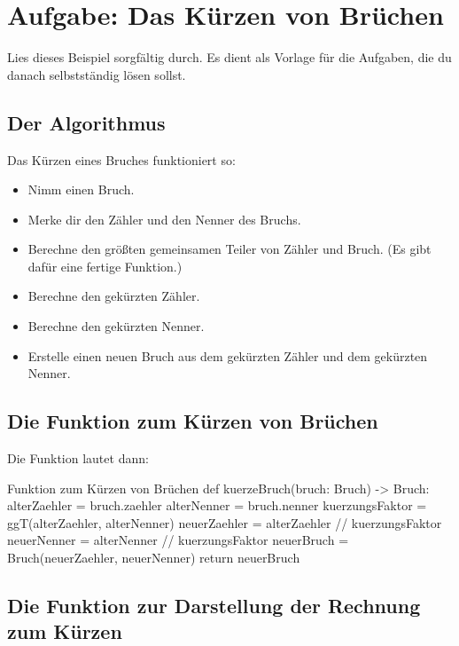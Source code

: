 \section{Aufgabe: Das Kürzen von Brüchen}

Lies dieses Beispiel sorgfältig durch. Es dient als Vorlage für die Aufgaben, die du danach selbstständig lösen sollst.

\subsection{Der Algorithmus}

Das Kürzen eines Bruches funktioniert so:
\begin{itemize}
	\item Nimm einen Bruch.
	\item Merke dir den Zähler und den Nenner des Bruchs.
	\item Berechne den größten gemeinsamen Teiler von Zähler und Bruch. (Es gibt dafür eine fertige Funktion.)
	\item Berechne den gekürzten Zähler.
	\item Berechne den gekürzten Nenner.
	\item Erstelle einen neuen Bruch aus dem gekürzten Zähler und dem gekürzten Nenner.
\end{itemize}

\subsection{Die Funktion zum Kürzen von Brüchen}

Die Funktion lautet dann:

\begin{codePython}{Funktion zum Kürzen von Brüchen}
def kuerzeBruch(bruch: Bruch) -> Bruch:
	alterZaehler = bruch.zaehler
	alterNenner = bruch.nenner
	kuerzungsFaktor = ggT(alterZaehler, alterNenner)
	neuerZaehler = alterZaehler // kuerzungsFaktor
	neuerNenner = alterNenner // kuerzungsFaktor
	neuerBruch = Bruch(neuerZaehler, neuerNenner)
	return neuerBruch
\end{codePython}

\subsection{Die Funktion zur Darstellung der Rechnung zum Kürzen}

